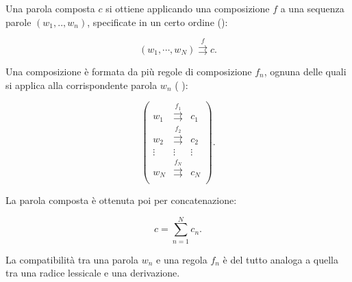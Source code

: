 \documentclass[twoside,stylearticle,11pt,filologia,it,article,bibsection]{spinoza}
\newcommand\spzmcompder{\rightrightarrows}
\newcommand\spzmconcat{\sum}
\newenvironment{lingmeq}{\begin{lingeq}\[}{\]\end{lingeq}}
\begin{document}
Una parola composta $c$ si ottiene applicando una composizione $f$ a
una sequenza parole $(w_1,..,w_n)$, specificate in un certo ordine
(\vedi {}):
\begin{lingmeq}
(w_1,\cdots,w_N) \stackrel{f}{\spzmcompder} c.
\end{lingmeq}


Una composizione è formata da più regole di composizione $f_n$, ognuna
delle quali si applica alla corrispondente parola $w_n$ (\vedi
{}):
\begin{lingmeq}
\left(
\begin{array}{ccc}
w_1 & \stackrel{f_1}{\spzmcompder} & c_1\\
w_2 & \stackrel{f_2}{\spzmcompder} & c_2\\
\vdots &\vdots &\vdots \\
w_N & \stackrel{f_N}{\spzmcompder} & c_N \\
\end{array}\right).
\end{lingmeq}
\noindent La parola composta è ottenuta poi per concatenazione:
\begin{lingmeq}
c=\spzmconcat_{n=1}^{N}c_n.
\end{lingmeq}


La compatibilità tra una parola $w_n$ e una regola $f_n$ è del tutto
analoga a quella tra una radice lessicale e una derivazione.
\end{document}
